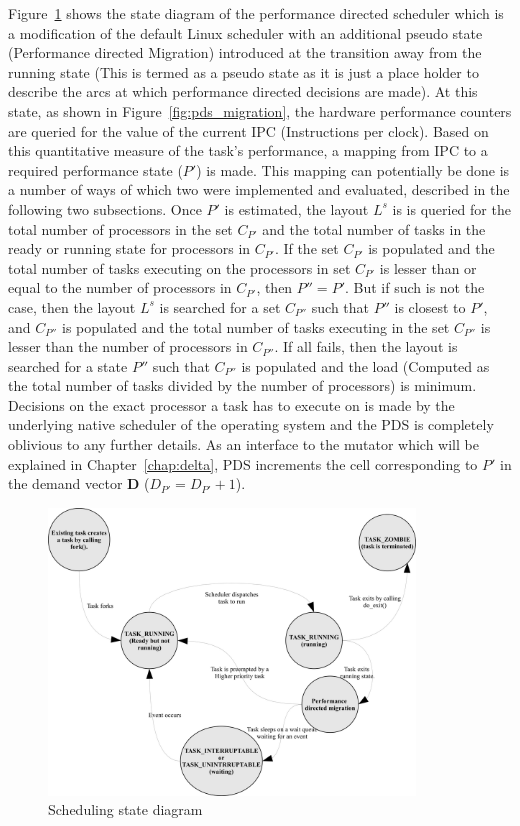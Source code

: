Figure~\ref{fig:pds_method} shows the state diagram of the performance directed scheduler which is a modification of
the default Linux scheduler with an additional pseudo state (Performance directed Migration) introduced at the transition 
away from the running state (This is termed as a pseudo state as it is just a place holder to describe the arcs at 
which performance directed decisions are made). At this state, as shown in Figure~\ref{fig:pds_migration}, the hardware 
performance counters are queried for the value of the current IPC (Instructions per clock). 
Based on this quantitative measure of the task's performance,
a mapping from IPC to a required performance state ($P'$) is made. This mapping can potentially be done is a number of ways 
of which two were implemented and evaluated, described in the following two subsections. Once $P'$ is estimated, 
the layout $L^s$ is is queried for the total number of processors in the set $C_{P'}$ and the total number of tasks in the 
ready or running state for processors in $C_{P'}$. If the set $C_{P'}$ is populated and the total number of tasks executing 
on the processors in set $C_{P'}$ is lesser than or equal
to the number of processors in $C_{P'}$, then $P'' = P'$. But if such is not the case, then the layout $L^s$ is searched
for a set $C_{P''}$ such that $P''$ is closest to $P'$, and $C_{P''}$ is populated and the total number of tasks 
executing in the set $C_{P''}$ is lesser than the number of processors in $C_{P''}$. If all fails, then the layout
is searched for a state $P''$ such that $C_{P''}$ is populated and the load (Computed as the total number of tasks 
divided by the number of processors) is minimum. Decisions on the exact processor a task has to execute on is made by the 
underlying native scheduler of the operating system and the PDS is completely oblivious to any further details.
As an interface to the mutator which will be explained in Chapter~\ref{chap:delta}, PDS
increments the cell corresponding to $P'$ in the demand vector \textbf{D} ($D_{P'} = D_{P'} + 1$).

\begin{figure}[h!]
  \begin{center}
    \includegraphics[height=3in]{figures/Mod_Linux_Sched.jpg}%
    \caption{Scheduling state diagram}
    \label{fig:pds_method}
  \end{center}
\end{figure}

